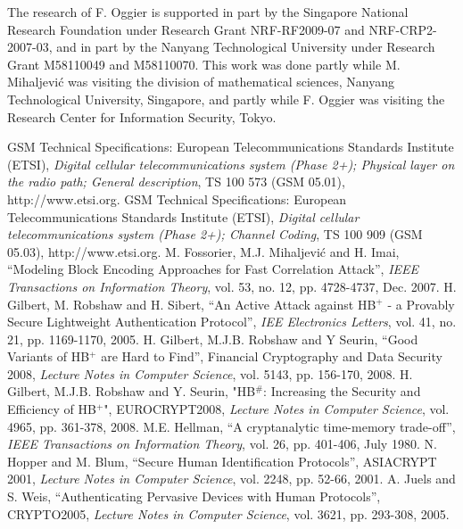 \documentclass{article}[11pt]
\begin{document}
The research of F. Oggier is supported in part by the Singapore National
Research Foundation under Research Grant NRF-RF2009-07 and
NRF-CRP2-2007-03, and in part by the Nanyang Technological University
under Research Grant M58110049 and M58110070.
This work was done partly while M. Mihaljevi\'c was visiting the division of
mathematical sciences, Nanyang Technological University, Singapore, and
partly while F. Oggier was visiting the Research Center for Information
Security, Tokyo.




\begin{thebibliography}{99}
GSM Technical Specifications: European Telecommunications
Standards Institute (ETSI), {\em Digital cellular
telecommunications system (Phase 2+); Physical layer on the radio
path; General description}, TS 100 573 (GSM 05.01),
http://www.etsi.org.
GSM Technical Specifications: European Telecommunications
Standards Institute (ETSI), {\em Digital cellular
telecommunications system (Phase 2+); Channel Coding}, TS 100 909
(GSM 05.03), http://www.etsi.org.
 M. Fossorier, M.J. Mihaljevi\'{c} and H. Imai,
``Modeling Block Encoding Approaches for Fast Correlation
Attack'', {\em IEEE Transactions on Information Theory}, vol. 53,
no. 12, pp. 4728-4737, Dec. 2007.
H. Gilbert, M. Robshaw and H. Sibert, ``An Active Attack against
HB$^+$ - a Provably Secure Lightweight Authentication Protocol'',
{\em IEE Electronics Letters}, vol. 41, no. 21, pp. 1169-1170,
2005.
 H. Gilbert, M.J.B. Robshaw and Y Seurin,
``Good Variants of HB$^+$ are Hard to Find'', Financial
Cryptography and Data Security 2008, {\em Lecture Notes in
Computer Science}, vol. 5143, pp. 156-170, 2008.
H. Gilbert, M.J.B. Robshaw and Y. Seurin, "HB$^{\#}$: Increasing
the Security and Efficiency of HB$^+$", EUROCRYPT2008, {\em
Lecture Notes in Computer Science}, vol. 4965, pp. 361-378, 2008.
M.E. Hellman, ``A cryptanalytic time-memory trade-off'', {\em IEEE
Transactions on Information Theory}, vol. 26, pp. 401-406, July
1980.
N. Hopper and M. Blum, ``Secure Human Identification Protocols'',
ASIACRYPT 2001, {\em Lecture Notes in Computer Science}, vol.
2248, pp. 52-66, 2001.
A. Juels and S. Weis, ``Authenticating Pervasive Devices with
Human Protocols'',  CRYPTO2005, {\em Lecture Notes in Computer
Science}, vol. 3621, pp. 293-308, 2005.

\end{thebibliography}
\end{document}
